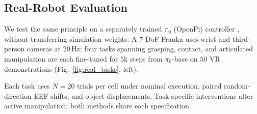 \documentclass[letterpaper, 10 pt, conference]{ieeeconf}
\begin{document}
\subsection{Real-Robot Evaluation}
\label{sec:real_robot}
We test the same principle on a separately trained $\pi_0$ (OpenPi) controller \cite{pi0}, without transferring simulation weights. A 7-DoF Franka uses wrist and third-person cameras at $20$\,Hz; four tasks spanning grasping, contact, and articulated manipulation are each fine-tuned for $5$k steps from $\pi_0$-base on $50$ VR demonstrations (Fig.~\ref{fig:real_tasks}, left).

Each task uses $N{=}20$ trials per cell under nominal execution, paired random-direction EEF shifts, and object displacements. Task-specific interventions alter active manipulation; both methods share each specification.

\setlength{\textfloatsep}{1.2\baselineskip plus 2pt minus 2pt}
\begin{table}[t]
\caption{Franka success (\%, $\pi_0$-base; $N{=}20$/cell, $80$ overall). Robot: random-direction EEF shift; world: object shift. $\Delta$: +DUET minus $\pi_0$.}
\label{tab:real_robot}
\centering
\footnotesize
\setlength{\tabcolsep}{2.6pt}
\end{table}
\end{document}
